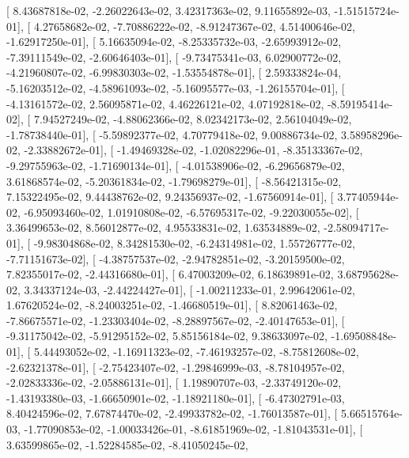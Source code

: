 \documentclass{article}
\begin{document}
       [  8.43687818e-02,  -2.26022643e-02,   3.42317363e-02,
          9.11655892e-03,  -1.51515724e-01],
       [  4.27658682e-02,  -7.70886222e-02,  -8.91247367e-02,
          4.51400646e-02,  -1.62917250e-01],
       [  5.16635094e-02,  -8.25335732e-03,  -2.65993912e-02,
         -7.39111549e-02,  -2.60646403e-01],
       [ -9.73475341e-03,   6.02900772e-02,  -4.21960807e-02,
         -6.99830303e-02,  -1.53554878e-01],
       [  2.59333824e-04,  -5.16203512e-02,  -4.58961093e-02,
         -5.16095577e-03,  -1.26155704e-01],
       [ -4.13161572e-02,   2.56095871e-02,   4.46226121e-02,
          4.07192818e-02,  -8.59195414e-02],
       [  7.94527249e-02,  -4.88062366e-02,   8.02342173e-02,
          2.56104049e-02,  -1.78738440e-01],
       [ -5.59892377e-02,   4.70779418e-02,   9.00886734e-02,
          3.58958296e-02,  -2.33882672e-01],
       [ -1.49469328e-02,  -1.02082296e-01,  -8.35133367e-02,
         -9.29755963e-02,  -1.71690134e-01],
       [ -4.01538906e-02,  -6.29656879e-02,   3.61868574e-02,
         -5.20361834e-02,  -1.79698279e-01],
       [ -8.56421315e-02,   7.15322495e-02,   9.44438762e-02,
          9.24356937e-02,  -1.67560914e-01],
       [  3.77405944e-02,  -6.95093460e-02,   1.01910808e-02,
         -6.57695317e-02,  -9.22030055e-02],
       [  3.36499653e-02,   8.56012877e-02,   4.95533831e-02,
          1.63534889e-02,  -2.58094717e-01],
       [ -9.98304868e-02,   8.34281530e-02,  -6.24314981e-02,
          1.55726777e-02,  -7.71151673e-02],
       [ -4.38757537e-02,  -2.94782851e-02,  -3.20159500e-02,
          7.82355017e-02,  -2.44316680e-01],
       [  6.47003209e-02,   6.18639891e-02,   3.68795628e-02,
          3.34337124e-03,  -2.44224427e-01],
       [ -1.00211233e-01,   2.99642061e-02,   1.67620524e-02,
         -8.24003251e-02,  -1.46680519e-01],
       [  8.82061463e-02,  -7.86675571e-02,  -1.23303404e-02,
         -8.28897567e-02,  -2.40147653e-01],
       [ -9.31175042e-02,  -5.91295152e-02,   5.85156184e-02,
          9.38633097e-02,  -1.69508848e-01],
       [  5.44493052e-02,  -1.16911323e-02,  -7.46193257e-02,
         -8.75812608e-02,  -2.62321378e-01],
       [ -2.75423407e-02,  -1.29846999e-03,  -8.78104957e-02,
         -2.02833336e-02,  -2.05886131e-01],
       [  1.19890707e-03,  -2.33749120e-02,  -1.43193380e-03,
         -1.66650901e-02,  -1.18921180e-01],
       [ -6.47302791e-03,   8.40424596e-02,   7.67874470e-02,
         -2.49933782e-02,  -1.76013587e-01],
       [  5.66515764e-03,  -1.77090853e-02,  -1.00033426e-01,
         -8.61851969e-02,  -1.81043531e-01],
       [  3.63599865e-02,  -1.52284585e-02,  -8.41050245e-02,
\end{document}
